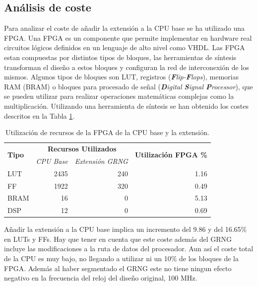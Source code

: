\subsection{Análisis de coste}

Para analizar el coste de añadir la extensión a la CPU base se ha utilizado una FPGA. Una FPGA es un componente que permite implementar en hardware real circuitos lógicos definidos en un lenguaje de alto nivel como VHDL. Las FPGA estan compuestas por distintos tipos de bloques, las herramientas de síntesis transforman el diseño a estos bloques y configuran la red de interconexión de los mismos. Algunos tipos de bloques son LUT, registros (\textit{\textbf{F}lip-\textbf{F}lops}), memorias RAM (BRAM) o bloques para procesado de señal (\textit{\textbf{D}igital \textbf{S}ignal \textbf{P}rocessor}), que se pueden utilizar para realizar operaciones matemáticas complejas como la multiplicación. Utilizando una herramienta de síntesis se han obtenido los costes descritos en la Tabla \ref{tab:riscv_fpga_utilization}.


\begin{table}[h]
\centering
\caption{Utilización de recursos de la FPGA de la CPU base y la extensión.}
\label{tab:riscv_fpga_utilization}
\begin{tabular}{lrrr}
\hline
\multirow{2}{*}{\textbf{Tipo}} & \multicolumn{2}{c}{\textbf{Recursos Utilizados}} & \multirow{2}{*}{\textbf{Utilización FPGA \%}}\\
 & \textit{CPU Base} & \textit{Extensión GRNG} & \\ \hline
LUT	        & 2435 & 240 & 1.16 \\
FF	        & 1922 & 320 & 0.49 \\
BRAM	    & 16   & 0 & 5.13 \\
DSP	        & 12   & 0 & 0.69 \\ \hline
\end{tabular}
\end{table}

Añadir la extensión a la CPU base implica un incremento del 9.86 y del 16.65\% en LUTs y FFs. Hay que tener en cuenta que este coste además del GRNG incluye las modificaciones a la ruta de datos del procesador. Aun así el coste total de la CPU es muy bajo, no llegando a utilizar ni un 10\% de los bloques de la FPGA. Además al haber segmentado el GRNG este no tiene ningun efecto negativo en la frecuencia del reloj del diseño original, 100 MHz.

